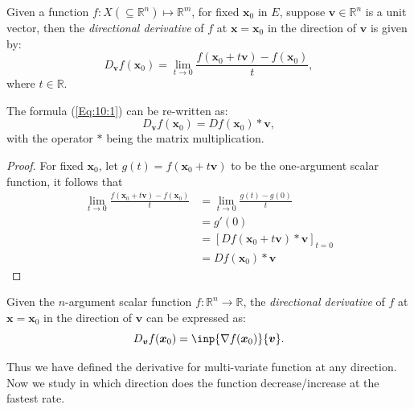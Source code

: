 \begin{definition}
Given a function $f:X(\subseteq\mathbb{R}^n)\mapsto\mathbb{R}^m$, for fixed $\bm x_0$ in $E$, suppose $\bm v\in\mathbb{R}^n$ is a unit vector, then the \emph{directional derivative} of $f$ at $\bm x=\bm x_0$ in the direction of $\bm v$ is given by:
\begin{equation}\label{Eq:10:1}
D_{\bm v}f(\bm x_0)=\lim_{t\to0}\frac{f(\bm x_0+t\bm v) - f(\bm x_0)}{t},
\end{equation}
where $t\in\mathbb{R}$.
\end{definition}
\begin{proposition}
The formula (\ref{Eq:10:1}) can be re-written as:
\begin{equation}
D_{\bm v}f(\bm x_0)=Df(\bm x_0)*\bm v,
\end{equation}
with the operator $*$ being the matrix multiplication.
\end{proposition}
\begin{proof}
For fixed $\bm x_0$, let $g(t)=f(\bm x_0+t\bm v)$ to be the one-argument scalar function, it follows that
\begin{align*}
\lim_{t\to0}\frac{f(\bm x_0+t\bm v) - f(\bm x_0)}{t}&=\lim_{t\to0}\frac{g(t) - g(0)}{t}\\
&=g'(0)\\
&=[Df(\bm x_0+t\bm v)*\bm v]_{t=0}\\
&=Df(\bm x_0)*\bm v
\end{align*}
\end{proof}
\begin{corollary}
Given the $n$-argument scalar function $f:\mathbb{R}^n\to\mathbb{R}$, the \emph{directional derivative} of $f$ at $\bm x=\bm x_0$ in the direction of $\bm v$ can be expressed as:
\[
D_{\bm v}f(\bm x_0)=\inp{\nabla f(\bm x_0)}{\bm v}.
\]
\end{corollary}
Thus we have defined the derivative for multi-variate function at any direction. Now we study in which direction does the function decrease/increase at the fastest rate.



